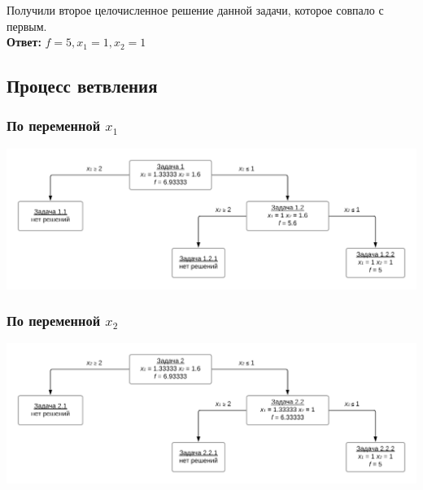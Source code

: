\documentclass[14pt,a4paper,fleqn]{extarticle}
\begin{document}
	Получили второе целочисленное решение данной задачи, которое совпало с первым.\\
	
	\textbf{Ответ:} $f = 5, x_1 = 1, x_2 = 1$
	\newpage
	\subsection*{Процесс ветвления}
	\subsubsection*{По переменной $x_1$}
	\includegraphics[scale=0.18]{1}
	\subsubsection*{По переменной $x_2$}
	\includegraphics[scale=0.18]{2}
\end{document}
